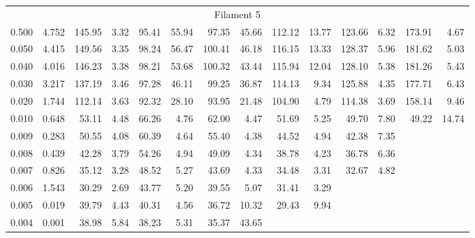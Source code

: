 \begin{tabular}{@{}lrrrrrrrrrrrrr@{}}
\midrule
\multicolumn{14}{c}{Filament 5} \\
\cmidrule{1-14}
0.500 & 4.752 & 145.95 & 3.32 & 95.41 & 55.94 &  97.35 & 45.66 & 112.12 & 13.77 & 123.66 & 6.32 & 173.91 & 4.67 \\
0.050 & 4.415 & 149.56 & 3.35 & 98.24 & 56.47 & 100.41 & 46.18 & 116.15 & 13.33 & 128.37 & 5.96 & 181.62 & 5.03 \\
0.040 & 4.016 & 146.23 & 3.38 & 98.21 & 53.68 & 100.32 & 43.44 & 115.94 & 12.04 & 128.10 & 5.38 & 181.26 & 5.43 \\
0.030 & 3.217 & 137.19 & 3.46 & 97.28 & 46.11 &  99.25 & 36.87 & 114.13 & 9.34 & 125.88 & 4.35 & 177.71 & 6.43 \\
0.020 & 1.744 & 112.14 & 3.63 & 92.32 & 28.10 &  93.95 & 21.48 & 104.90 & 4.79 & 114.38 & 3.69 & 158.14 & 9.46 \\
0.010 & 0.648 &  53.11 & 4.48 & 66.26 &  4.76 &  62.00 &  4.47 &  51.69 & 5.25 & 49.70 & 7.80 & 49.22 & 14.74 \\
0.009 & 0.283 &  50.55 & 4.08 & 60.39 &  4.64 &  55.40 &  4.38 &  44.52 & 4.94 & 42.38 & 7.35 &       &            \\
0.008 & 0.439 &  42.28 & 3.79 & 54.26 &  4.94 &  49.09 &  4.34 &  38.78 & 4.23 & 36.78 & 6.36 &       &            \\
0.007 & 0.826 &  35.12 & 3.28 & 48.52 &  5.27 &  43.69 &  4.33 &  34.48 & 3.31 & 32.67 & 4.82 &       &            \\
0.006 & 1.543 &  30.29 & 2.69 & 43.77 &  5.20 &  39.55 &  5.07 &  31.41 & 3.29 &       &      &       &            \\
0.005 & 0.019 &  39.79 & 4.43 & 40.31 &  4.56 &  36.72 & 10.32 &  29.43 & 9.94 &       &      &       &            \\
0.004 & 0.001 &  38.98 & 5.84 & 38.23 &  5.31 &  35.37 & 43.65 &        &      &       &      &       &            \\

\bottomrule
\end{tabular}
